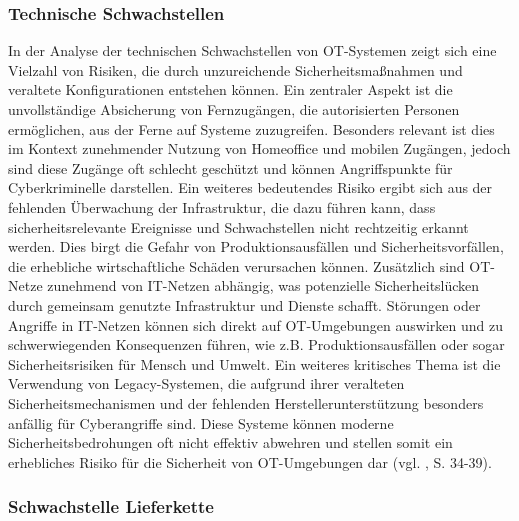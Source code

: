 \subsubsection{Technische Schwachstellen}

In der Analyse der technischen Schwachstellen von OT-Systemen zeigt sich eine Vielzahl von Risiken, die durch unzureichende Sicherheitsmaßnahmen und veraltete Konfigurationen entstehen können. Ein zentraler Aspekt ist die unvollständige Absicherung von Fernzugängen, die autorisierten Personen ermöglichen, aus der Ferne auf Systeme zuzugreifen. Besonders relevant ist dies im Kontext zunehmender Nutzung von Homeoffice und mobilen Zugängen, jedoch sind diese Zugänge oft schlecht geschützt und können Angriffspunkte für Cyberkriminelle darstellen. Ein weiteres bedeutendes Risiko ergibt sich aus der fehlenden Überwachung der Infrastruktur, die dazu führen kann, dass sicherheitsrelevante Ereignisse und Schwachstellen nicht rechtzeitig erkannt werden. Dies birgt die Gefahr von Produktionsausfällen und Sicherheitsvorfällen, die erhebliche wirtschaftliche Schäden verursachen können. Zusätzlich sind OT-Netze zunehmend von IT-Netzen abhängig, was potenzielle Sicherheitslücken durch gemeinsam genutzte Infrastruktur und Dienste schafft. Störungen oder Angriffe in IT-Netzen können sich direkt auf OT-Umgebungen auswirken und zu schwerwiegenden Konsequenzen führen, wie z.B. Produktionsausfällen oder sogar Sicherheitsrisiken für Mensch und Umwelt. Ein weiteres kritisches Thema ist die Verwendung von Legacy-Systemen, die aufgrund ihrer veralteten Sicherheitsmechanismen und der fehlenden Herstellerunterstützung besonders anfällig für Cyberangriffe sind. Diese Systeme können moderne Sicherheitsbedrohungen oft nicht effektiv abwehren und stellen somit ein erhebliches Risiko für die Sicherheit von OT-Umgebungen dar (vgl. \cite{ICS}, S. 34-39). 


\subsubsection{Schwachstelle Lieferkette}

